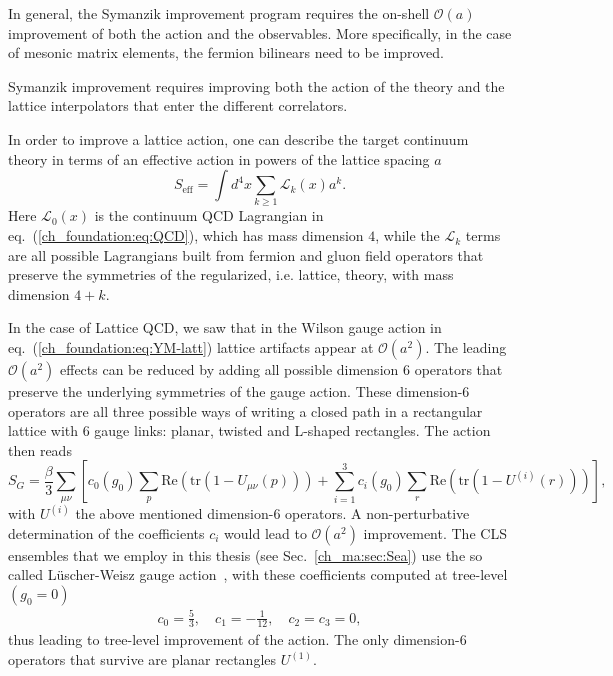 In general, the Symanzik improvement program requires the on-shell $\mathcal{O}(a)$ improvement of both the action and the observables.
More specifically, in the case of mesonic matrix elements, the fermion bilinears need to be improved.

Symanzik improvement requires improving both the action of the theory and the lattice interpolators that enter the different correlators. 

In order to improve a lattice action, one can describe the target continuum theory in terms of an effective action in powers of the lattice spacing $a$
\begin{equation}
S_{\textrm{eff}}=\int d^4x\sum_{k\geq1}\mathcal{L}_k(x)a^{k}.
\end{equation}
Here $\mathcal{L}_0(x)$ is the continuum QCD Lagrangian in eq.~(\ref{ch_foundation:eq:QCD}), which has mass dimension $4$, while the $\mathcal{L}_k$ terms are all possible Lagrangians built from fermion and gluon field operators that preserve the symmetries of the regularized, i.e. lattice, theory, with mass dimension $4+k$.

In the case of Lattice QCD, we saw that in the Wilson gauge action in eq.~(\ref{ch_foundation:eq:YM-latt}) lattice artifacts appear at $\mathcal{O}(a^2)$. The leading $\mathcal{O}(a^2)$ effects can be reduced by adding all possible dimension $6$ operators that preserve the underlying symmetries of the gauge action. These dimension-6 operators are all three possible ways of writing a closed path in a rectangular lattice with 6 gauge links: planar, twisted and L-shaped rectangles. The action then reads
\begin{equation}
\label{ch_foundation:eq:SG_impr}
S_G=\frac{\beta}{3}\sum_{\mu\nu}\left[c_0(g_0)\sum_p{\textrm{Re}}\left({\textrm{tr}}\left(1-U_{\mu\nu}(p)\right)\right)+\sum_{i=1}^3c_i(g_0)\sum_r{\textrm{Re}}\left({\textrm{tr}}\left(1-U^{(i)}(r)\right)\right)\right],
\end{equation}
with $U^{(i)}$ the above mentioned dimension-6 operators. A non-perturbative determination of the coefficients $c_i$ would lead to $\mathcal{O}(a^2)$ improvement. The CLS ensembles that we employ in this thesis (see Sec.~\ref{ch_ma:sec:Sea}) use the so called Lüscher-Weisz gauge action~\citep{Luscher:1984xn,Luscher:1985zq}, with these coefficients computed at tree-level $(g_0=0)$
\begin{gather}
\label{ch_foundation:eq:LW}
c_0=\frac{5}{3}, \quad
c_1=-\frac{1}{12}, \quad
c_2=c_3=0,
\end{gather}
thus leading to tree-level improvement of the action. The only dimension-6 operators that survive are planar rectangles $U^{(1)}$.

